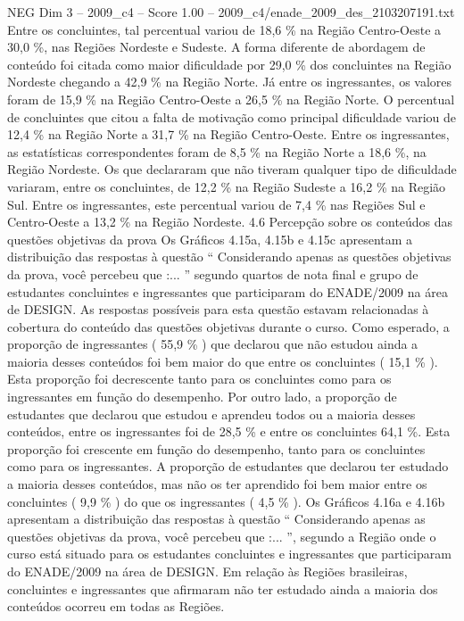 \begin{textsample}{NEG Dim 3 – 2009\_c4 – Score 1.00 – 2009\_c4/enade\_2009\_des\_2103207191.txt}
Entre os concluintes, tal percentual variou de 18,6 \% na Região Centro-Oeste a 30,0 \%, nas Regiões Nordeste e Sudeste.
A forma diferente de abordagem de conteúdo foi citada como maior dificuldade por 29,0 \% dos concluintes na Região Nordeste chegando a 42,9 \% na Região Norte.
Já entre os ingressantes, os valores foram de 15,9 \% na Região Centro-Oeste a 26,5 \% na Região Norte.
O percentual de concluintes que citou a falta de motivação como principal dificuldade variou de 12,4 \% na Região Norte a 31,7 \% na Região Centro-Oeste.
Entre os ingressantes, as estatísticas correspondentes foram de 8,5 \% na Região Norte a 18,6 \%, na Região Nordeste.
Os que declararam que não tiveram qualquer tipo de dificuldade variaram, entre os concluintes, de 12,2 \% na Região Sudeste a 16,2 \% na Região Sul.
Entre os ingressantes, este percentual variou de 7,4 \% nas Regiões Sul e Centro-Oeste a 13,2 \% na Região Nordeste. 4.6 Percepção sobre os conteúdos das questões objetivas da prova Os Gráficos 4.15a, 4.15b e 4.15c apresentam a distribuição das respostas à questão “ Considerando apenas as questões objetivas da prova, você percebeu que :... ” segundo quartos de nota final e grupo de estudantes concluintes e ingressantes que participaram do ENADE/2009 na área de DESIGN.
As respostas possíveis para esta questão estavam relacionadas à cobertura do conteúdo das questões objetivas durante o curso.
Como esperado, a proporção de ingressantes ( 55,9 \% ) que declarou que não estudou ainda a maioria desses conteúdos foi bem maior do que entre os concluintes ( 15,1 \% ).
Esta proporção foi decrescente tanto para os concluintes como para os ingressantes em função do desempenho.
Por outro lado, a proporção de estudantes que declarou que estudou e aprendeu todos ou a maioria desses conteúdos, entre os ingressantes foi de 28,5 \% e entre os concluintes 64,1 \%.
Esta proporção foi crescente em função do desempenho, tanto para os concluintes como para os ingressantes.
A proporção de estudantes que declarou ter estudado a maioria desses conteúdos, mas não os ter aprendido foi bem maior entre os concluintes ( 9,9 \% ) do que os ingressantes ( 4,5 \% ).
Os Gráficos 4.16a e 4.16b apresentam a distribuição das respostas à questão “ Considerando apenas as questões objetivas da prova, você percebeu que :... ”, segundo a Região onde o curso está situado para os estudantes concluintes e ingressantes que participaram do ENADE/2009 na área de DESIGN.
Em relação às Regiões brasileiras, concluintes e ingressantes que afirmaram não ter estudado ainda a maioria dos conteúdos ocorreu em todas as Regiões.

\end{textsample}
